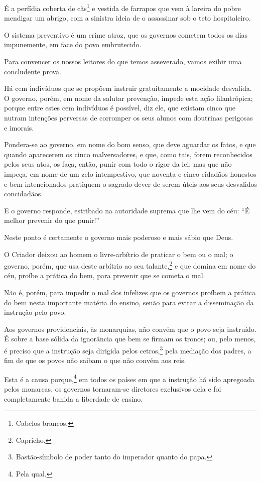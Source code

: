 É a perfídia coberta de cãs\footnote{Cabelos brancos.} e vestida de
farrapos que vem à lareira do pobre mendigar um abrigo, com a sinistra
ideia de o assassinar sob o teto hospitaleiro.

O sistema preventivo é um crime atroz, que os governos cometem todos os
dias impunemente, em face do povo embrutecido.

Para convencer os nossos leitores do que temos asseverado, vamos exibir
uma concludente prova.

Há cem indivíduos que se propõem instruir gratuitamente a mocidade
desvalida. O governo, porém, em nome da salutar prevenção, impede esta
ação filantrópica; porque entre estes cem indivíduos é possível, diz
ele, que existam cinco que nutram intenções perversas de corromper os
seus alunos com doutrinas perigosas e imorais.

Pondera-se ao governo, em nome do bom senso, que deve aguardar os fatos,
e que quando aparecerem os cinco malversadores, e que, como tais, forem
reconhecidos pelos seus atos, os faça, então, punir com todo o rigor da
lei; mas que não impeça, em nome de um zelo intempestivo, que noventa e
cinco cidadãos honestos e bem intencionados pratiquem o sagrado dever de
serem úteis aos seus desvalidos concidadãos.

E o governo responde, estribado na autoridade suprema que lhe vem do
céu: ``É melhor prevenir do que punir!''

Neste ponto é certamente o governo mais poderoso e mais sábio que Deus.

O Criador deixou ao homem o livre-arbítrio de praticar o bem ou o mal; o
governo, porém, que usa deste arbítrio ao seu talante,\footnote{
  Capricho.} e que domina em nome do céu, proíbe a prática do bem, para
prevenir que se cometa o mal.

Não é, porém, para impedir o mal dos infelizes que os governos proíbem a
prática do bem nesta importante matéria do ensino, senão para evitar a
disseminação da instrução pelo povo.

Aos governos providenciais, às monarquias, não convém que o povo seja
instruído. É sobre a base sólida da ignorância que bem se firmam os
tronos; ou, pelo menos, é preciso que a instrução seja dirigida pelos
cetros,\footnote{Bastão-símbolo de poder tanto do imperador quanto do
  papa.} pela mediação dos padres, a fim de que os povos não saibam o
que não convém aos reis.

Esta é a causa porque,\footnote{Pela qual.} em todos os países em que
a instrução há sido apregoada pelos monarcas, os governos tornaram-se
diretores exclusivos dela e foi completamente banida a liberdade de
ensino.

